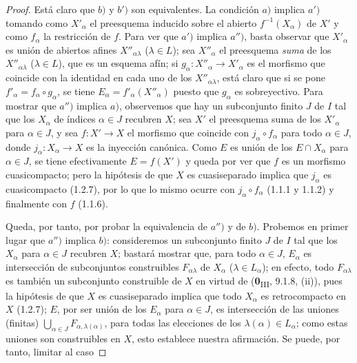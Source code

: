 \begin{proof}
Está claro que $b)$ y $b')$ son equivalentes. La condición $a)$ implica
$a')$ tomando como $X'_\alpha$ el preesquema inducido sobre el abierto
$f^{-1}(X_\alpha)$ de $X'$ y como $f_\alpha$ la restricción de $f$. Para
ver que $a')$ implica $a'')$, basta observar que $X'_\alpha$ es
unión de abiertos afines $X''_{\alpha\lambda}$ ($\lambda\in L$); sea
$X''_\alpha$ el preesquema \emph{suma} de los $X''_{\alpha\lambda}$
($\lambda\in L$), que es un esquema afín; si
$g_\alpha:X''_\alpha\to X'_\alpha$ es el morfismo que coincide con
la identidad en cada uno de los $X''_{\alpha\lambda}$, está claro que si se
pone $f'_\alpha=f_\alpha\circ g_\alpha$, se tiene
$E_\alpha=f'_\alpha(X''_\alpha)$ puesto que $g_\alpha$ es sobreyectivo. Para
mostrar que $a'')$ implica $a)$, observemos que hay un subconjunto finito $J$ de
$I$ tal que los $X_\alpha$ de índices $\alpha\in J$ recubren $X$; sea
$X'$ el preesquema suma de los $X'_\alpha$ para $\alpha\in J$, y sea
$f:X'\to X$ el morfismo que coincide con $j_\alpha\circ f_\alpha$ para todo
$\alpha\in J$, donde $j_\alpha:X_\alpha\to X$ es la inyección canónica. Como
$E$ es unión de los $E\cap X_\alpha$ para $\alpha\in J$, se tiene efectivamente
$E=f(X')$ y queda por ver que $f$ es un morfismo cuasicompacto; pero
la hipótesis de que $X$ es cuasiseparado implica que $j_\alpha$ es
cuasicompacto (1.2.7), por lo que lo mismo ocurre con
$j_\alpha\circ f_\alpha$ (1.1.1 y 1.1.2) y finalmente con $f$ (1.1.6).

Queda, por tanto, por probar la equivalencia de $a'')$ y de $b)$. Probemos en primer
lugar que $a'')$ implica $b)$: consideremos un subconjunto finito $J$ de $I$ tal
que los $X_\alpha$ para $\alpha\in J$ recubren $X$; bastará mostrar
que, para todo $\alpha\in J$, $E_\alpha$ es intersección de subconjuntos
construibles $F_{\alpha\lambda}$ de $X_\alpha$ ($\lambda\in L_\alpha$);
en efecto, todo $F_{\alpha\lambda}$ es también un subconjunto construible de $X$
en virtud de (\textbf{0}\textsubscript{III}, 9.1.8, (ii)), pues la hipótesis de que $X$ es
cuasiseparado implica que todo $X_\alpha$ es retrocompacto en $X$ (1.2.7);
$E$, por ser unión de los $E_\alpha$ para $\alpha\in J$, es intersección de las
uniones (finitas) $\bigcup_{\alpha\in J}F_{\alpha,\lambda(\alpha)}$, para
todas las elecciones de los $\lambda(\alpha)\in L_\alpha$; como estas uniones son
construibles en $X$, esto establece nuestra afirmación. Se puede, por tanto, limitar
al caso



\end{proof}
